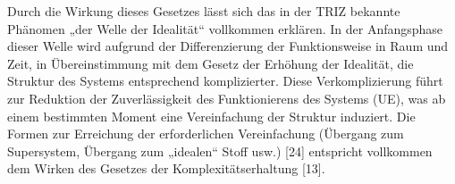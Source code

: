 \documentclass[11pt,a4paper]{article}
\begin{document}
\begin{emph}
  Durch die Wirkung dieses Gesetzes lässt sich das in der TRIZ bekannte
  Phänomen „der Welle der Idealität“ vollkommen erklären. In der Anfangsphase
  dieser Welle wird aufgrund der Differenzierung der Funktionsweise in Raum
  und Zeit, in Übereinstimmung mit dem Gesetz der Erhöhung der Idealität, die
  Struktur des Systems entsprechend komplizierter. Diese Verkomplizierung
  führt zur Reduktion der Zuverlässigkeit des Funktionierens des Systems (UE),
  was ab einem bestimmten Moment eine Vereinfachung der Struktur induziert.
  Die Formen zur Erreichung der erforderlichen Vereinfachung (Übergang zum
  Supersystem, Übergang zum „idealen“ Stoff usw.) [24] entspricht vollkommen
  dem Wirken des Gesetzes der Komplexitätserhaltung [13].
\end{emph}
\end{document}
